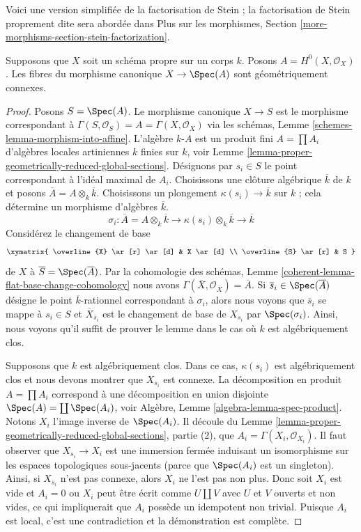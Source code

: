 \noindent
Voici une version simplifiée de la factorisation de Stein ; la
factorisation de Stein proprement dite sera abordée dans Plus sur les
morphismes, Section \ref{more-morphisms-section-stein-factorization}.

\begin{lemma}
\label{lemma-baby-stein}
Supposons que $X$ soit un schéma propre sur un corps $k$.
Posons $A = H^0(X, \mathcal{O}_X)$. Les fibres du morphisme
canonique $X \to \Spec(A)$ sont géométriquement connexes.
\end{lemma}

\begin{proof}
Posons $S = \Spec(A)$. Le morphisme canonique $X \to S$
est le morphisme correspondant à $\Gamma(S, \mathcal{O}_S)
= A = \Gamma(X, \mathcal{O}_X)$ via les schémas, Lemme
\ref{schemes-lemma-morphism-into-affine}. L'algèbre
$k$-$A$ est un produit fini $A = \prod A_i$ d'algèbres
locales artiniennes $k$ finies sur $k$, voir Lemme
\ref{lemma-proper-geometrically-reduced-global-sections}.
Désignons par $s_i \in S$ le point correspondant à l'idéal
maximal de $A_i$. Choisissons une clôture algébrique
$\overline{k}$ de $k$ et posons $\overline{A} = A \otimes_k
\overline{k}$. Choisissons un plongement $\kappa(s_i) \to
\overline{k}$ sur $k$ ; cela détermine un morphisme d'algèbres $\overline{k}$.
$$
\sigma_i : \overline{A} = A \otimes_k \overline{k} \to
\kappa(s_i) \otimes_k \overline{k} \to \overline{k}
$$
Considérez le changement de base
$$
\xymatrix{
\overline{X} \ar[r] \ar[d] & X \ar[d] \\
\overline{S} \ar[r] & S
}
$$
de $X$ à $\overline{S} = \Spec(\overline{A})$. Par la
cohomologie des schémas, Lemme
\ref{coherent-lemma-flat-base-change-cohomology} nous avons
$\Gamma(\overline{X}, \mathcal{O}_{\overline{X}}) =
\overline{A}$. Si $\overline{s}_i \in \Spec(\overline{A})$
désigne le point $\overline{k}$-rationnel correspondant à
$\sigma_i$, alors nous voyons que $\overline{s}_i$ se mappe à $s_i
\in S$ et $\overline{X}_{\overline{s}_i}$ est le changement de
base de $X_{s_i}$ par $\Spec(\sigma_i)$. Ainsi, nous voyons qu'il
suffit de prouver le lemme dans le cas où $k$ est algébriquement clos.

\medskip\noindent
Supposons que $k$ est algébriquement clos. Dans ce cas,
$\kappa(s_i)$ est algébriquement clos et nous devons montrer
que $X_{s_i}$ est connexe. La décomposition en produit $A =
\prod A_i$ correspond à une décomposition en union disjointe
$\Spec(A) = \coprod \Spec(A_i)$, voir Algèbre, Lemme
\ref{algebra-lemma-spec-product}. Notons $X_i$ l'image
inverse de $\Spec(A_i)$. Il découle du Lemme
\ref{lemma-proper-geometrically-reduced-global-sections},
partie (2), que $A_i = \Gamma(X_i, \mathcal{O}_{X_i})$. Il faut
observer que $X_{s_i} \to X_i$ est une immersion fermée
induisant un isomorphisme sur les espaces topologiques
sous-jacents (parce que $\Spec(A_i)$ est un singleton). Ainsi, si
$X_{s_i}$ n'est pas connexe, alors $X_i$ ne l'est pas non plus.
Donc soit $X_i$ est vide et $A_i = 0$ ou $X_i$ peut être écrit
comme $U \amalg V$ avec $U$ et $V$ ouverts et non vides, ce qui
impliquerait que $A_i$ possède un idempotent non trivial. Puisque
$A_i$ est local, c'est une contradiction et la démonstration est complète.
\end{proof}


